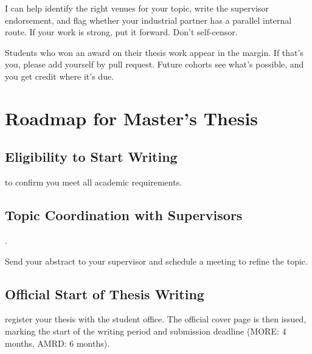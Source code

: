 \documentclass{../sharedAssets/tufte}
\begin{document}
 I can help identify the right venues for your topic, write the supervisor endorsement, and flag whether your industrial partner has a parallel internal route. If your work is strong, put it forward. Don't self-censor.

 Students who won an award on their thesis work appear in the margin. If that's you, please add yourself by pull request. Future cohorts see what's possible, and you get credit where it's due.



\iffalse
\chapter*{Roadmap for Master's Thesis}


\section{Eligibility to Start Writing}
 to confirm you meet all academic requirements.





\section{Topic Coordination with Supervisors}
. 

Send your abstract to your supervisor and schedule a meeting to refine the topic.



\section{Official Start of Thesis Writing}
 register your thesis with the student office. The official cover page is then issued, marking the start of the writing period and submission deadline (MORE: 4 months, AMRD: 6 months).
\end{document}
